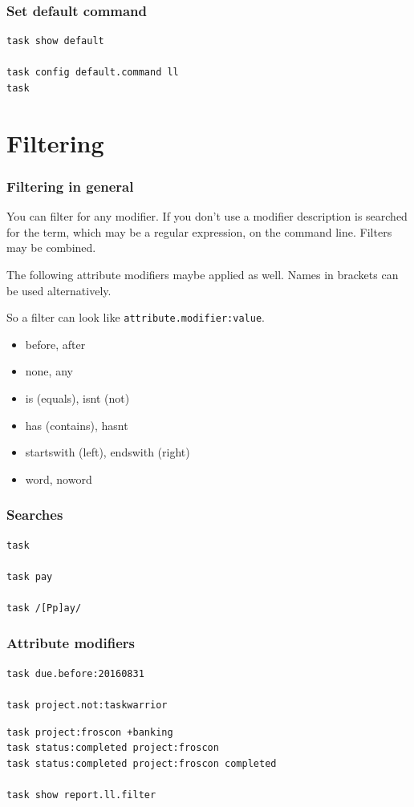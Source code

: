 \documentclass[t,handout]{beamer}
\begin{document}
\begin{frame}[fragile]\frametitle{Set default command}
    \vfill
    \begin{lstlisting}
task show default

task config default.command ll
task\end{lstlisting}
\end{frame}

\section{Filtering}

\begin{frame}[fragile]\frametitle{Filtering in general}
    You can filter for any modifier. If you don't use a modifier description is searched for the term, which may be a regular expression, on the command line. Filters may be combined.

    The following attribute modifiers maybe applied as well. Names in brackets can be used alternatively.

    So a filter can look like \verb=attribute.modifier:value=.

    \begin{itemize}
        \item before, after
        \item none, any
        \item is (equals), isnt (not)
        \item has (contains), hasnt
        \item startswith (left), endswith (right)
        \item word, noword
    \end{itemize}
\end{frame}

\begin{frame}[fragile]\frametitle{Searches}
    \vfill
    \begin{lstlisting}
task

task pay

task /[Pp]ay/\end{lstlisting}
\end{frame}

\begin{frame}[fragile]\frametitle{Attribute modifiers}
    \vfill
    \begin{lstlisting}
task due.before:20160831

task project.not:taskwarrior\end{lstlisting} \pause

    \begin{lstlisting}
task project:froscon +banking
task status:completed project:froscon
task status:completed project:froscon completed

task show report.ll.filter\end{lstlisting}
\end{frame}
\end{document}
